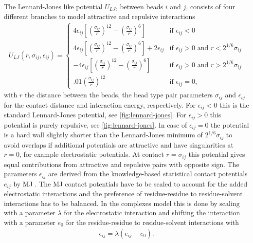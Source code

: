 \documentclass[12pt, twoside]{report}
\begin{document}
The Lennard-Jones like potential \(U_{LJ}\), between beads \(i\) and \(j\),
consists of four different branches to model attractive and repulsive
interactions
\begin{align}
  \label{eq:ch5:complexesLJ}
  U_{LJ} (r, \sigma_{ij}, \epsilon_{ij}) = \begin{cases}
    4 \epsilon_{ij} \left[\left(\frac{\sigma_{ij}}{r}\right)^{12} - \left(\frac{\sigma_{ij}}{r}\right)^{6}\right] &\mbox{if } \epsilon_{ij} < 0 \\
    4 \epsilon_{ij} \left[\left(\frac{\sigma_{ij}}{r}\right)^{12} - \left(\frac{\sigma_{ij}}{r}\right)^{6}\right] + 2 \epsilon_{ij} &\mbox{if } \epsilon_{ij} > 0 \mbox{ and } r < 2^{1/6} \sigma_{ij} \\
    - 4 \epsilon_{ij} \left[\left(\frac{\sigma_{ij}}{r}\right)^{12} - \left(\frac{\sigma_{ij}}{r}\right)^{6}\right] &\mbox{if } \epsilon_{ij} > 0 \mbox{ and } r > 2^{1/6} \sigma_{ij} \\
    .01 \left(\frac{\sigma_{ij}}{r}\right)^{12} &\mbox{if } \epsilon_{ij} = 0,
  \end{cases}
\end{align}
with $r$ the distance between the beads, the bead type pair parameters
\(\sigma_{ij}\) and \(\epsilon_{ij}\) for the contact distance and interaction
energy, respectively. For \(\epsilon_{ij} < 0\) this is the standard
Lennard-Jones potential, see \cref{fig:lennard-jones}. For \(\epsilon_{ij} > 0\)
this potential is purely repulsive, see \cref{fig:lennard-jones}. In case of
\(\epsilon_{ij}=0\) the potential is a hard wall slightly shorter than the
Lennard-Jones minimum of \(2^{1/6} \sigma_{ij}\) to avoid overlaps if additional
potentials are attractive and have singularities at \(r=0\), for example
electrostatic potentials. At contact \(r=\sigma_{ij}\) this potential gives
equal contributions from attractive and repulsive pairs with opposite sign. The
parameters \(\epsilon_{ij}\) are derived from the knowledge-based statistical
contact potentials \(e_{ij}\) by \gls{MJ} \cite{Miyazawa1996}. The \gls{MJ}
contact potentials have to be scaled to account for the added electrostatic
interactions and the preference of residue-residue to residue-solvent
interactions has to be balanced. In the complexes model this is done by scaling
with a parameter \(\lambda\) for the electrostatic interaction and shifting the
interaction with a parameter \(e_0\) for the residue-residue to residue-solvent
interactions with
\begin{align}
  \label{eq:ch5:complexesEpsilon} \epsilon_{ij} = \lambda (e_{ij} - e_0).
\end{align}
\end{document}
